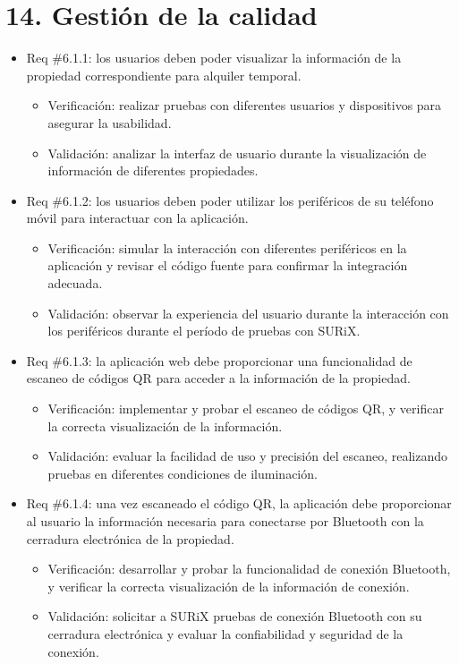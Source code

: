 \documentclass[
11pt, %
codirector, %
]{charter}
\begin{document}
\section{14. Gestión de la calidad}
\label{sec:calidad}
\begin{itemize}
\item Req \#6.1.1: los usuarios deben poder visualizar la información de la propiedad correspondiente para alquiler temporal.
\begin{itemize}
\item Verificación: realizar pruebas con diferentes usuarios y dispositivos para asegurar la usabilidad.
\item Validación: analizar la interfaz de usuario durante la visualización de información de diferentes propiedades.
\end{itemize}

\item Req \#6.1.2: los usuarios deben poder utilizar los periféricos de su teléfono móvil para interactuar con la aplicación.
    \begin{itemize}
        \item Verificación: simular la interacción con diferentes periféricos en la aplicación y revisar el código fuente para confirmar la integración adecuada.
        \item Validación: observar la experiencia del usuario durante la interacción con los periféricos durante el período de pruebas con SURiX.
    \end{itemize}

    \item Req \#6.1.3: la aplicación web debe proporcionar una funcionalidad de escaneo de códigos QR para acceder a la información de la propiedad.
    \begin{itemize}
        \item Verificación: implementar y probar el escaneo de códigos QR, y verificar la correcta visualización de la información.
        \item Validación: evaluar la facilidad de uso y precisión del escaneo, realizando pruebas en diferentes condiciones de iluminación.
    \end{itemize}

    \item Req \#6.1.4: una vez escaneado el código QR, la aplicación debe proporcionar al usuario la información necesaria para conectarse por Bluetooth con la cerradura electrónica de la propiedad.
    \begin{itemize}
        \item Verificación: desarrollar y probar la funcionalidad de conexión Bluetooth, y verificar la correcta visualización de la información de conexión.
        \item Validación: solicitar a SURiX pruebas de conexión Bluetooth con su cerradura electrónica y evaluar la confiabilidad y seguridad de la conexión.
    \end{itemize}


\end{itemize}
\end{document}

